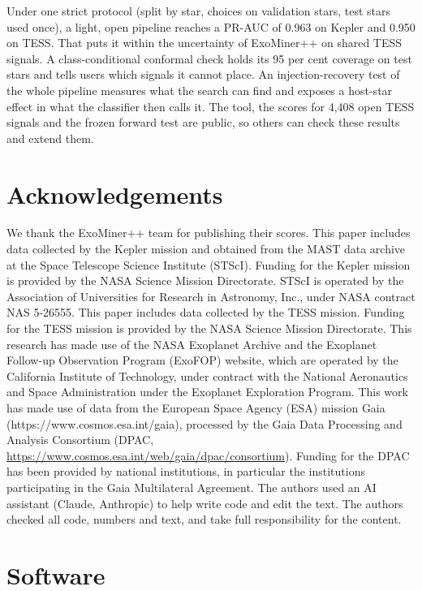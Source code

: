 \documentclass[fleqn,usenatbib]{mnras}
\begin{document}
Under one strict protocol (split by star, choices on validation stars, test stars used once), a light, open pipeline reaches a PR-AUC of 0.963 on Kepler and 0.950 on TESS. That puts it within the uncertainty of ExoMiner++ on shared TESS signals. A class-conditional conformal check holds its 95 per cent coverage on test stars and tells users which signals it cannot place. An injection-recovery test of the whole pipeline measures what the search can find and exposes a host-star effect in what the classifier then calls it. The tool, the scores for 4,408 open TESS signals and the frozen forward test are public, so others can check these results and extend them.

\section*{Acknowledgements}

We thank the ExoMiner++ team for publishing their scores. This paper includes data collected by the Kepler mission and obtained from the MAST data archive at the Space Telescope Science Institute (STScI). Funding for the Kepler mission is provided by the NASA Science Mission Directorate. STScI is operated by the Association of Universities for Research in Astronomy, Inc., under NASA contract NAS 5-26555. This paper includes data collected by the TESS mission. Funding for the TESS mission is provided by the NASA Science Mission Directorate. This research has made use of the NASA Exoplanet Archive and the Exoplanet Follow-up Observation Program (ExoFOP) website, which are operated by the California Institute of Technology, under contract with the National Aeronautics and Space Administration under the Exoplanet Exploration Program. This work has made use of data from the European Space Agency (ESA) mission Gaia (https://www.cosmos.esa.int/gaia), processed by the Gaia Data Processing and Analysis Consortium (DPAC, \url{https://www.cosmos.esa.int/web/gaia/dpac/consortium}). Funding for the DPAC has been provided by national institutions, in particular the institutions participating in the Gaia Multilateral Agreement. The authors used an AI assistant (Claude, Anthropic) to help write code and edit the text. The authors checked all code, numbers and text, and take full responsibility for the content.

\section*{Software}
\end{document}
